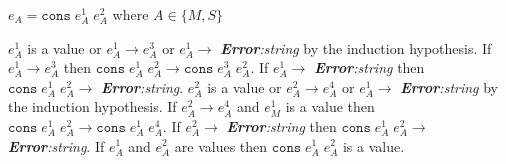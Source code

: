 \begin{case}
$e_{A}=\mathtt{cons}\;e_{A}^{1}\;e_{A}^{2}$ where $A\in\lbrace M,S\rbrace$

$e_{A}^{1}$ is a value or $e_{A}^{1}\rightarrow e_{A}^{3}$ or $e_{A}^{1}\rightarrow$ \emph{\textbf{Error}:\;string} by the induction hypothesis.  If $e_{A}^{1}\rightarrow e_{A}^{3}$ then $\mathtt{cons}\;e_{A}^{1}\;e_{A}^{2}\rightarrow\mathtt{cons}\;e_{A}^{3}\;e_{A}^{2}$.  If $e_{A}^{1}\rightarrow$ \emph{\textbf{Error}:\;string} then $\mathtt{cons}\;e_{A}^{1}\;e_{A}^{2}\rightarrow$ \emph{\textbf{Error}:\;string}.  $e_{A}^{2}$ is a value or $e_{A}^{2}\rightarrow e_{A}^{4}$ or $e_{A}^{1}\rightarrow$ \emph{\textbf{Error}:\;string} by the induction hypothesis.  If $e_{A}^{2}\rightarrow e_{A}^{4}$ and $e_{M}^{1}$ is a value then $\mathtt{cons}\;e_{A}^{1}\;e_{A}^{2}\rightarrow\mathtt{cons}\;e_{A}^{1}\;e_{A}^{4}$.  If $e_{A}^{2}\rightarrow$ \emph{\textbf{Error}:\;string} then $\mathtt{cons}\;e_{A}^{1}\;e_{A}^{2}\rightarrow$ \emph{\textbf{Error}:\;string}.  If $e_{A}^{1}$ and $e_{A}^{2}$ are values then $\mathtt{cons}\;e_{A}^{1}\;e_{A}^{2}$ is a value.
\end{case}